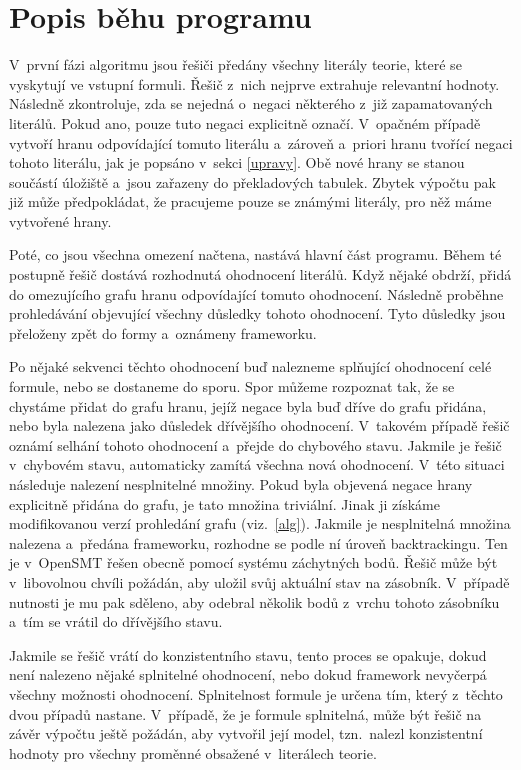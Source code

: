 \section{Popis běhu programu}

V~první fázi algoritmu jsou řešiči předány všechny literály teorie, které se vyskytují ve vstupní formuli. Řešič z~nich nejprve extrahuje relevantní hodnoty. Následně zkontroluje, zda se nejedná o~negaci některého z~již zapamatovaných literálů. Pokud ano, pouze tuto negaci explicitně označí. V~opačném případě vytvoří hranu odpovídající tomuto literálu a~zároveň a~priori hranu tvořící negaci tohoto literálu, jak je popsáno v~sekci \ref{upravy}. Obě nové hrany se stanou součástí úložiště a~jsou zařazeny do překladových tabulek. Zbytek výpočtu pak již může předpokládat, že pracujeme pouze se známými literály, pro něž máme vytvořené hrany.

Poté, co jsou všechna omezení načtena, nastává hlavní část programu. Během té postupně řešič dostává rozhodnutá ohodnocení literálů. Když nějaké obdrží, přidá do omezujícího grafu hranu odpovídající tomuto ohodnocení. Následně proběhne prohledávání objevující všechny důsledky tohoto ohodnocení. Tyto důsledky jsou přeloženy zpět do formy  a~oznámeny frameworku.

Po nějaké sekvenci těchto ohodnocení buď nalezneme splňující ohodnocení celé formule, nebo se dostaneme do sporu. Spor můžeme rozpoznat tak, že se chystáme přidat do grafu hranu, jejíž negace byla buď dříve do grafu přidána, nebo byla nalezena jako důsledek dřívějšího ohodnocení. V~takovém případě řešič oznámí selhání tohoto ohodnocení a~přejde do chybového stavu. Jakmile je řešič v~chybovém stavu, automaticky zamítá všechna nová ohodnocení. V~této situaci následuje nalezení nesplnitelné množiny. Pokud byla objevená negace hrany explicitně přidána do grafu, je tato množina triviální. Jinak ji získáme modifikovanou verzí prohledání grafu (viz.~\ref{alg}). Jakmile je nesplnitelná množina nalezena a~předána frameworku, rozhodne se podle ní úroveň backtrackingu. Ten je v~OpenSMT řešen obecně pomocí systému záchytných bodů. Řešič může být v~libovolnou chvíli požádán, aby uložil svůj aktuální stav na zásobník. V~případě nutnosti je mu pak sděleno, aby odebral několik bodů z~vrchu tohoto zásobníku a~tím se vrátil do dřívějšího stavu. 

Jakmile se řešič vrátí do konzistentního stavu, tento proces se opakuje, dokud není nalezeno nějaké splnitelné ohodnocení, nebo dokud framework nevyčerpá všechny možnosti ohodnocení. Splnitelnost formule je určena tím, který z~těchto dvou případů nastane. V~případě, že je formule splnitelná, může být řešič na závěr výpočtu ještě požádán, aby vytvořil její model, tzn.~nalezl konzistentní hodnoty pro všechny proměnné obsažené v~literálech teorie.

